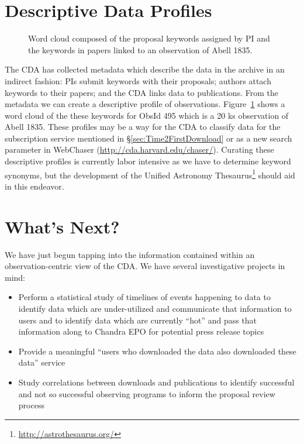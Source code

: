 \section{Descriptive Data Profiles}

\begin{figure}[here]
\caption[WordCloud]
 { \label{fig:WordCloud}
Word cloud composed of the proposal keywords assigned by PI and the keywords in papers linked to an observation of Abell 1835.
 }
\end{figure}

The CDA has collected metadata which describe the data in the archive in an indirect fashion:  PIs submit keywords with their proposals; authors attach keywords to their papers; and the CDA links data to publications.  From the metadata we can create a descriptive profile of observations.  Figure~\ref{fig:WordCloud} shows a word cloud of the these keywords for ObsId 495 which is a 20 ks observation of Abell 1835.  These profiles may be a way for the CDA to classify data for the subscription service mentioned in \S\ref{sec:Time2FirstDownload} or as a new search parameter in WebChaser (\url{http://cda.harvard.edu/chaser/}).  Curating these descriptive profiles is currently labor intensive as we have to determine keyword synonyms, but the development of the Unified Astronomy Thesaurus\footnote{\url{http://astrothesaurus.org/}} should aid in this endeavor.

\section{What's Next?}
We have just begun tapping into the information contained within an observation-centric view of the CDA.  We have several investigative projects in mind:
\begin{itemize}
\item Perform a statistical study of timelines of events happening to data to identify data which are under-utilized and communicate that information to users and to identify data which are currently ``hot'' and pass that information along to Chandra EPO for potential press release topics
\item Provide a meaningful ``users who downloaded the data also downloaded these data'' service
\item Study correlations between downloads and publications to identify successful and not so successful observing programs to inform the proposal review process\end{itemize}

